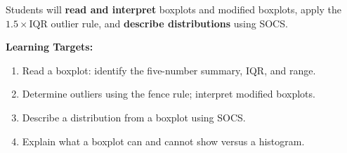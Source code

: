 \documentclass[aspectratio=169, 11pt]{beamer}
\begin{document}
{
\begin{frame}[t, plain]
  \vspace{0.45cm}\par
  \hspace{0.55cm}%
  \begin{minipage}{0.9\textwidth}


    \normalsize
    Students will \textbf{read and interpret} boxplots and modified boxplots,
    apply the $1.5 \times \text{IQR}$ outlier rule, and \textbf{describe
    distributions} using SOCS.

    \vspace{0.5cm}
    \textbf{Learning Targets:}
    \begin{enumerate}\small
      \setlength{\itemsep}{0.4em}
      \item Read a boxplot: identify the five-number summary, IQR, and range.
      \item Determine outliers using the fence rule; interpret modified boxplots.
      \item Describe a distribution from a boxplot using SOCS.
      \item Explain what a boxplot can and cannot show versus a histogram.
    \end{enumerate}
  \end{minipage}
\end{frame}
}
\end{document}
